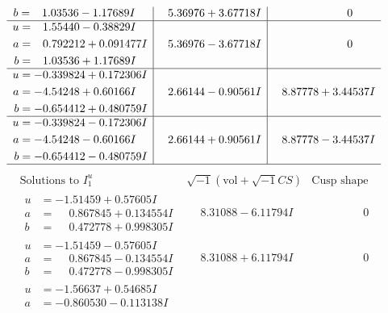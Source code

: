 \documentclass[1p]{elsarticle_modified}
\theoremstyle{definition}
\newcommand{\I}{\sqrt{-1}}
\begin{document}
$$\begin{array}{c|c|c}
\begin{aligned}
b &= \phantom{-}1.03536 - 1.17689 I\end{aligned}
 & \phantom{-}5.36976 + 3.67718 I & \phantom{-0.000000 } 0 \\ \hline\begin{aligned}
u &= \phantom{-}1.55440 - 0.38829 I \\
a &= \phantom{-}0.792212 + 0.091477 I \\
b &= \phantom{-}1.03536 + 1.17689 I\end{aligned}
 & \phantom{-}5.36976 - 3.67718 I & \phantom{-0.000000 } 0 \\ \hline\begin{aligned}
u &= -0.339824 + 0.172306 I \\
a &= -4.54248 + 0.60166 I \\
b &= -0.654412 + 0.480759 I\end{aligned}
 & \phantom{-}2.66144 - 0.90561 I & \phantom{-}8.87778 + 3.44537 I \\ \hline\begin{aligned}
u &= -0.339824 - 0.172306 I \\
a &= -4.54248 - 0.60166 I \\
b &= -0.654412 - 0.480759 I\end{aligned}
 & \phantom{-}2.66144 + 0.90561 I & \phantom{-}8.87778 - 3.44537 I\\
 \hline 
 \end{array}$$\newpage$$\begin{array}{c|c|c}  
\text{Solutions to }I^u_{1}& \I (\text{vol} + \sqrt{-1}CS) & \text{Cusp shape}\\
 \hline 
\begin{aligned}
u &= -1.51459 + 0.57605 I \\
a &= \phantom{-}0.867845 + 0.134554 I \\
b &= \phantom{-}0.472778 + 0.998305 I\end{aligned}
 & \phantom{-}8.31088 - 6.11794 I & \phantom{-0.000000 } 0 \\ \hline\begin{aligned}
u &= -1.51459 - 0.57605 I \\
a &= \phantom{-}0.867845 - 0.134554 I \\
b &= \phantom{-}0.472778 - 0.998305 I\end{aligned}
 & \phantom{-}8.31088 + 6.11794 I & \phantom{-0.000000 } 0 \\ \hline\begin{aligned}
u &= -1.56637 + 0.54685 I \\
a &= -0.860530 - 0.113138 I \\

\end{aligned}
\end{array}$$
\end{document}
